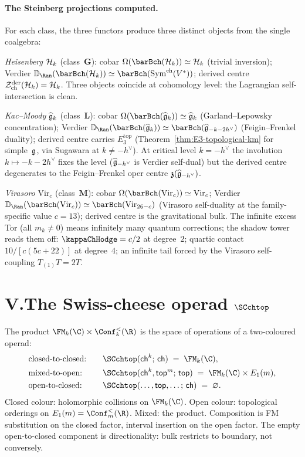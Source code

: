 \paragraph{The Steinberg projections computed.}
For each class, the three functors produce three distinct
objects from the single coalgebra:

\smallskip\emph{Heisenberg} $\mathcal{H}_k$ (class~$\mathbf{G}$): cobar
$\Omega(\barBch(\cH_k)) \simeq \cH_k$ (trivial inversion);
Verdier $\mathbb{D}_{\Ran}(\barBch(\cH_k)) \simeq
\barBch(\mathrm{Sym}^{\mathrm{ch}}(V^*))$;
derived centre $\mathcal{Z}^{\mathrm{der}}_{\mathrm{ch}}(\mathcal{H}_k) = \mathcal{H}_k$.
Three objects coincide at cohomology level: the Lagrangian
self-intersection is clean.

\smallskip\emph{Kac--Moody} $\widehat{\mathfrak{g}}_k$ (class~$\mathbf{L}$): cobar
$\Omega(\barBch(\widehat{\fg}_k)) \simeq \widehat{\fg}_k$
(Garland--Lepowsky concentration); Verdier
$\mathbb{D}_{\Ran}(\barBch(\widehat{\fg}_k)) \simeq
\barBch(\widehat{\fg}_{-k-2h^\vee})$ (Feigin--Frenkel duality);
derived centre carries $E_3^{\mathrm{top}}$
(Theorem~\ref{thm:E3-topological-km} for simple~$\mathfrak{g}$, via
Sugawara at $k \neq -h^\vee$). At critical level $k = -h^\vee$
the involution $k \mapsto -k - 2h^\vee$ fixes the level
($\widehat{\mathfrak{g}}_{-h^\vee}$ is Verdier self-dual) but the derived
centre degenerates to the Feigin--Frenkel oper centre
$\mathfrak{z}(\widehat{\mathfrak{g}}_{-h^\vee})$.

\smallskip\emph{Virasoro} $\mathrm{Vir}_c$ (class~$\mathbf{M}$):
cobar $\Omega(\barBch(\mathrm{Vir}_c)) \simeq \mathrm{Vir}_c$;
Verdier $\mathbb{D}_{\Ran}(\barBch(\mathrm{Vir}_c)) \simeq
\barBch(\mathrm{Vir}_{26-c})$ (Virasoro self-duality at the
family-specific value $c = 13$); derived centre is the
gravitational bulk. The infinite excess Tor (all $m_k \neq 0$)
means infinitely many quantum corrections; the shadow tower
reads them off: $\kappaChHodge = c/2$ at degree~$2$;
quartic contact $10/[c(5c{+}22)]$ at degree~$4$; an infinite
tail forced by the Virasoro self-coupling $T_{(1)}T = 2T$.

\section*{V.\quad The Swiss-cheese operad $\SCchtop$}

The product $\FM_k(\C) \times \Conf_k^<(\R)$ is the space of
operations of a two-coloured operad:
\begin{alignat*}{2}
&\text{closed-to-closed:}\quad
&&\SCchtop(\mathsf{ch}^k;\,\mathsf{ch})
\;=\; \FM_k(\C), \\
&\text{mixed-to-open:}\quad
&&\SCchtop(\mathsf{ch}^k, \mathsf{top}^m;\,\mathsf{top})
\;=\; \FM_k(\C) \times E_1(m), \\
&\text{open-to-closed:}\quad
&&\SCchtop(\ldots, \mathsf{top}, \ldots;\,\mathsf{ch})
\;=\; \varnothing.
\end{alignat*}
Closed colour: holomorphic collisions on $\FM_k(\C)$. Open
colour: topological orderings on $E_1(m) = \Conf_m^<(\R)$.
Mixed: the product. Composition is FM substitution on the
closed factor, interval insertion on the open factor. The empty
open-to-closed component is directionality: bulk restricts to
boundary, not conversely.


